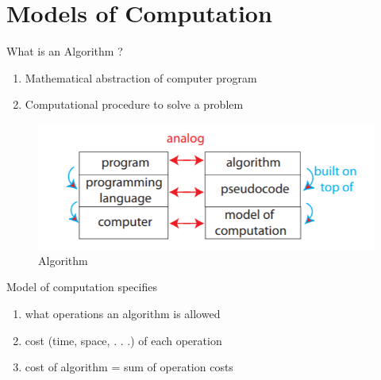 \graphicspath{ {lecture2/} }
\section{Models of Computation}

What is an Algorithm ? 
\begin{enumerate}
    \item Mathematical abstraction of computer program
    \item Computational procedure to solve a problem
\end{enumerate}

\begin{figure}[H]
    \includegraphics[width=\textwidth]{Figure1}
    \centering
    \caption{Algorithm}
    \label{fig:img1}
\end{figure}


\noindent Model of computation specifies
\begin{enumerate}
    \item what operations an algorithm is allowed
    \item cost (time, space, . . .) of each operation
    \item cost of algorithm = sum of operation costs
\end{enumerate}